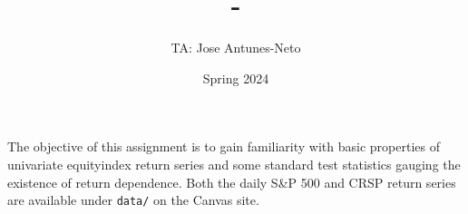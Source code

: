\documentclass[12pt,twoside]{article}
\title{\course-\assignment}
\author{TA: Jose Antunes-Neto}
\date{Spring 2024}
\begin{document}
\maketitle

The objective of this assignment is to gain familiarity with basic properties of univariate equityindex return series and some standard test statistics gauging the existence of return dependence. Both the daily S\&P 500 and CRSP return series are available under \texttt{data/} on the Canvas site.

\problem


\clearpage 

\problem


\clearpage

\problem


\clearpage

\problem


\clearpage

\problem


\clearpage

\problem


\clearpage

\problem 


\clearpage

\problem


\clearpage



\end{document}
